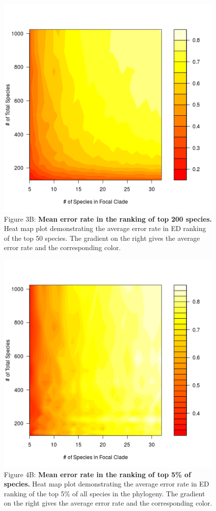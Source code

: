 \documentclass[12pt,english]{article}
\begin{document}
\begin{figure}[!ht]
  \center
  \includegraphics[width=.5\textwidth]{errorRate200.png}
  \caption*{Figure 3B: \textbf{Mean error rate in the ranking of top 200 species.} Heat map
  plot demonstrating the average error rate in ED ranking of the top 50 species.
  The gradient on the right gives the average error rate and the corresponding
  color.}
\end{figure}

\begin{figure}[!ht]
  \center
  \includegraphics[width=.5\textwidth]{errorRate5pct.png}
  \caption*{Figure 4B: \textbf{Mean error rate in the ranking of top 5\% of species.} Heat
  map plot demonstrating the average error rate in ED ranking of the top 5\% of
  all species in the phylogeny. The gradient on the right gives the average
  error rate and the corresponding color.}
\end{figure}
\end{document}
